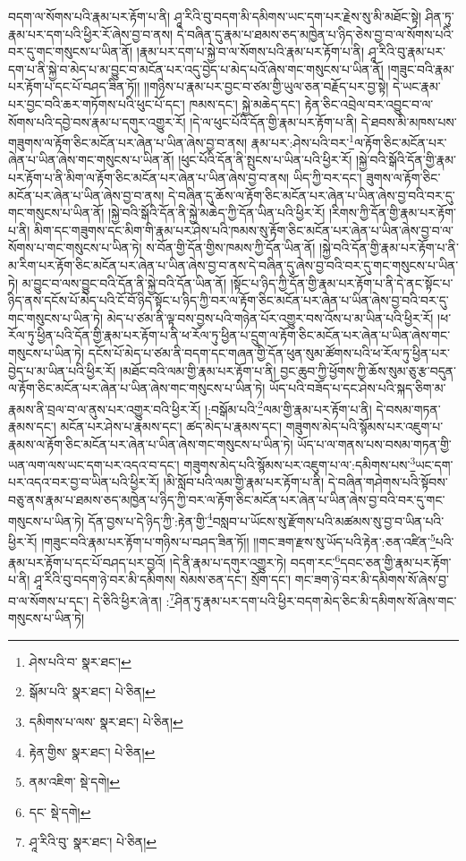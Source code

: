 བདག་ལ་སོགས་པའི་རྣམ་པར་རྟོག་པ་ནི། ཤཱ་རིའི་བུ་བདག་མི་དམིགས་ཡང་དག་པར་རྗེས་སུ་མི་མཐོང་སྟེ། ཤིན་ཏུ་རྣམ་པར་དག་པའི་ཕྱིར་རོ་ཞེས་བྱ་བ་ནས། དེ་བཞིན་དུ་རྣམ་པ་ཐམས་ཅད་མཁྱེན་པ་ཉིད་ཅེས་བྱ་བ་ལ་སོགས་པའི་བར་དུ་གང་གསུངས་པ་ཡིན་ནོ། །རྣམ་པར་དག་པ་སྐྱེ་བ་ལ་སོགས་པའི་རྣམ་པར་རྟོག་པ་ནི། ཤཱ་རིའི་བུ་རྣམ་པར་དག་པ་ནི་སྐྱེ་བ་མེད་པ་མ་བྱུང་བ་མངོན་པར་འདུ་བྱེད་པ་མེད་པའོ་ཞེས་གང་གསུངས་པ་ཡིན་ནོ། །གཟུང་བའི་རྣམ་པར་རྟོག་པ་དང་པོ་བཤད་ཟིན་ཏོ།། །།གཉིས་པ་རྣམ་པར་བྱང་བ་ཙམ་གྱི་ཡུལ་ཅན་བརྗོད་པར་བྱ་སྟེ། དེ་ཡང་རྣམ་པར་བྱང་བའི་ཆར་གཏོགས་པའི་ཕུང་པོ་དང་། ཁམས་དང་། སྐྱེ་མཆེད་དང་། རྟེན་ཅིང་འབྲེལ་བར་འབྱུང་བ་ལ་སོགས་པའི་དབྱེ་བས་རྣམ་པ་དགུར་འགྱུར་རོ། །དེ་ལ་ཕུང་པོའི་དོན་གྱི་རྣམ་པར་རྟོག་པ་ནི། དེ་ཐབས་མི་མཁས་པས་གཟུགས་ལ་རྟོག་ཅིང་མངོན་པར་ཞེན་པ་ཡིན་ཞེས་བྱ་བ་ནས། རྣམ་པར་:ཤེས་པའི་བར་\footnote{ཤེས་པའི་བ་  སྣར་ཐང་། }ལ་རྟོག་ཅིང་མངོན་པར་ཞེན་པ་ཡིན་ཞེས་གང་གསུངས་པ་ཡིན་ནོ། །ཕུང་པོའི་དོན་ནི་སྤུངས་པ་ཡིན་པའི་ཕྱིར་རོ། །སྐྱེ་བའི་སྒོའི་དོན་གྱི་རྣམ་པར་རྟོག་པ་ནི་མིག་ལ་རྟོག་ཅིང་མངོན་པར་ཞེན་པ་ཡིན་ཞེས་བྱ་བ་ནས། ཡིད་ཀྱི་བར་དང་། ཟུགས་ལ་རྟོག་ཅིང་མངོན་པར་ཞེན་པ་ཡིན་ཞེས་བྱ་བ་ནས། དེ་བཞིན་དུ་ཆོས་ལ་རྟོག་ཅིང་མངོན་པར་ཞེན་པ་ཡིན་ཞེས་བྱ་བའི་བར་དུ་གང་གསུངས་པ་ཡིན་ནོ། །སྐྱེ་བའི་སྒོའི་དོན་ནི་སྐྱེ་མཆེད་ཀྱི་དོན་ཡིན་པའི་ཕྱིར་རོ། །རིགས་ཀྱི་དོན་གྱི་རྣམ་པར་རྟོག་པ་ནི། མིག་དང་གཟུགས་དང་མིག་གི་རྣམ་པར་ཤེས་པའི་ཁམས་སུ་རྟོག་ཅིང་མངོན་པར་ཞེན་པ་ཡིན་ཞེས་བྱ་བ་ལ་སོགས་པ་གང་གསུངས་པ་ཡིན་ཏེ། ས་བོན་གྱི་དོན་གྱིས་ཁམས་ཀྱི་དོན་ཡིན་ནོ། །སྐྱེ་བའི་དོན་གྱི་རྣམ་པར་རྟོག་པ་ནི་མ་རིག་པར་རྟོག་ཅིང་མངོན་པར་ཞེན་པ་ཡིན་ཞེས་བྱ་བ་ནས་དེ་བཞིན་དུ་ཞེས་བྱ་བའི་བར་དུ་གང་གསུངས་པ་ཡིན་ཏེ། མ་བྱུང་བ་ལས་བྱུང་བའི་དོན་ནི་སྐྱེ་བའི་དོན་ཡིན་ནོ། །སྟོང་པ་ཉིད་ཀྱི་དོན་གྱི་རྣམ་པར་རྟོག་པ་ནི་དེ་ནང་སྟོང་པ་ཉིད་ནས་དངོས་པོ་མེད་པའི་ངོ་བོ་ཉིད་སྟོང་པ་ཉིད་ཀྱི་བར་ལ་རྟོག་ཅིང་མངོན་པར་ཞེན་པ་ཡིན་ཞེས་བྱ་བའི་བར་དུ་གང་གསུངས་པ་ཡིན་ཏེ། མེད་པ་ཙམ་ནི་ལྟ་བས་བྱས་པའི་གཉེན་པོར་འགྱུར་བས་འོས་པ་མ་ཡིན་པའི་ཕྱིར་རོ། །ཕ་རོལ་ཏུ་ཕྱིན་པའི་དོན་གྱི་རྣམ་པར་རྟོག་པ་ནི་ཕ་རོལ་ཏུ་ཕྱིན་པ་དྲུག་ལ་རྟོག་ཅིང་མངོན་པར་ཞེན་པ་ཡིན་ཞེས་གང་གསུངས་པ་ཡིན་ཏེ། དངོས་པོ་མེད་པ་ཙམ་ནི་བདག་དང་གཞན་གྱི་དོན་ཕུན་སུམ་ཚོགས་པའི་ཕ་རོལ་ཏུ་ཕྱིན་པར་བྱེད་པ་མ་ཡིན་པའི་ཕྱིར་རོ། །མཐོང་བའི་ལམ་གྱི་རྣམ་པར་རྟོག་པ་ནི། བྱང་ཆུབ་ཀྱི་ཕྱོགས་ཀྱི་ཆོས་སུམ་ཅུ་རྩ་བདུན་ལ་རྟོག་ཅིང་མངོན་པར་ཞེན་པ་ཡིན་ཞེས་གང་གསུངས་པ་ཡིན་ཏེ། ཡོད་པའི་བཟོད་པ་དང་ཤེས་པའི་སྐད་ཅིག་མ་རྣམས་ནི་བྲལ་བ་ལ་ནུས་པར་འགྱུར་བའི་ཕྱིར་རོ། །:བསྒོམ་པའི་\footnote{སྒོམ་པའི་  སྣར་ཐང་།  པེ་ཅིན། }ལམ་གྱི་རྣམ་པར་རྟོག་པ་ནི། དེ་བསམ་གཏན་རྣམས་དང་། མངོན་པར་ཤེས་པ་རྣམས་དང་། ཚད་མེད་པ་རྣམས་དང་། གཟུགས་མེད་པའི་སྙོམས་པར་འཇུག་པ་རྣམས་ལ་རྟོག་ཅིང་མངོན་པར་ཞེན་པ་ཡིན་ཞེས་གང་གསུངས་པ་ཡིན་ཏེ། ཡོད་པ་ལ་གནས་པས་བསམ་གཏན་གྱི་ཡན་ལག་ལས་ཡང་དག་པར་འདའ་བ་དང་། གཟུགས་མེད་པའི་སྙོམས་པར་འཇུག་པ་ལ་:དམིགས་པས་\footnote{དམིགས་པ་ལས་  སྣར་ཐང་།  པེ་ཅིན། }ཡང་དག་པར་འདའ་བར་བྱ་བ་ཡིན་པའི་ཕྱིར་རོ། །མི་སློབ་པའི་ལམ་གྱི་རྣམ་པར་རྟོག་པ་ནི། དེ་བཞིན་གཤེགས་པའི་སྟོབས་བཅུ་ནས་རྣམ་པ་ཐམས་ཅད་མཁྱེན་པ་ཉིད་ཀྱི་བར་ལ་རྟོག་ཅིང་མངོན་པར་ཞེན་པ་ཡིན་ཞེས་བྱ་བའི་བར་དུ་གང་གསུངས་པ་ཡིན་ཏེ། དོན་བྱས་པ་དེ་ཉིད་ཀྱི་:རྟེན་གྱི་\footnote{རྟེན་གྱིས་  སྣར་ཐང་།  པེ་ཅིན། }བསླབ་པ་ཡོངས་སུ་རྫོགས་པའི་མཚམས་སུ་བྱ་བ་ཡིན་པའི་ཕྱིར་རོ། །གཟུང་བའི་རྣམ་པར་རྟོག་པ་གཉིས་པ་བཤད་ཟིན་ཏོ།། །།གང་ཟག་རྫས་སུ་ཡོད་པའི་རྟེན་:ཅན་འཛིན་\footnote{ནམ་འཇིག་  སྡེ་དགེ། }པའི་རྣམ་པར་རྟོག་པ་དང་པོ་བཤད་པར་བྱའོ། །དེ་ནི་རྣམ་པ་དགུར་འགྱུར་ཏེ། བདག་རང་\footnote{དང་  སྡེ་དགེ། }དབང་ཅན་གྱི་རྣམ་པར་རྟོག་པ་ནི། ཤཱ་རིའི་བུ་བདག་ཉེ་བར་མི་དམིགས། སེམས་ཅན་དང་། སྲོག་དང་། གང་ཟག་ཉེ་བར་མི་དམིགས་སོ་ཞེས་བྱ་བ་ལ་སོགས་པ་དང་། དེ་ཅིའི་ཕྱིར་ཞེ་ན། :\footnote{ཤཱ་རིའི་བུ་  སྣར་ཐང་།  པེ་ཅིན། }ཤིན་ཏུ་རྣམ་པར་དག་པའི་ཕྱིར་བདག་མེད་ཅིང་མི་དམིགས་སོ་ཞེས་གང་གསུངས་པ་ཡིན་ཏེ། 